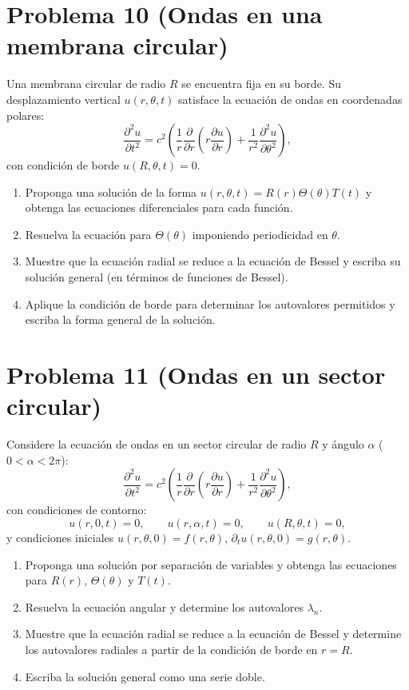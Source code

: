 \documentclass[12pt]{article}
\begin{document}
\section*{Problema 10 (Ondas en una membrana circular)}
Una membrana circular de radio \(R\) se encuentra fija en su borde. Su desplazamiento vertical \(u(r, \theta, t)\) satisface la ecuación de ondas en coordenadas polares:
\[
\frac{\partial^2 u}{\partial t^2} = c^2 \left( \frac{1}{r} \frac{\partial}{\partial r} \left( r \frac{\partial u}{\partial r} \right) + \frac{1}{r^2} \frac{\partial^2 u}{\partial \theta^2} \right),
\]
con condición de borde \(u(R, \theta, t) = 0\).
\begin{enumerate}
    \item[(a)] Proponga una solución de la forma \(u(r,\theta,t) = R(r)\Theta(\theta)T(t)\) y obtenga las ecuaciones diferenciales para cada función.
    \item[(b)] Resuelva la ecuación para \(\Theta(\theta)\) imponiendo periodicidad en \(\theta\).
    \item[(c)] Muestre que la ecuación radial se reduce a la ecuación de Bessel y escriba su solución general (en términos de funciones de Bessel).
    \item[(d)] Aplique la condición de borde para determinar los autovalores permitidos y escriba la forma general de la solución.
\end{enumerate}

\section*{Problema 11 (Ondas en un sector circular)}
Considere la ecuación de ondas en un sector circular de radio \(R\) y ángulo \(\alpha\) (\(0 < \alpha < 2\pi\)):
\[
\frac{\partial^2 u}{\partial t^2} = c^2 \left( \frac{1}{r} \frac{\partial}{\partial r} \left( r \frac{\partial u}{\partial r} \right) + \frac{1}{r^2} \frac{\partial^2 u}{\partial \theta^2} \right),
\]
con condiciones de contorno:
\[
u(r, 0, t) = 0, \qquad u(r, \alpha, t) = 0, \qquad u(R, \theta, t) = 0,
\]
y condiciones iniciales \(u(r, \theta, 0) = f(r, \theta)\), \(\partial_t u(r, \theta, 0) = g(r, \theta)\).
\begin{enumerate}
    \item[(a)] Proponga una solución por separación de variables y obtenga las ecuaciones para \(R(r)\), \(\Theta(\theta)\) y \(T(t)\).
    \item[(b)] Resuelva la ecuación angular y determine los autovalores \(\lambda_n\).
    \item[(c)] Muestre que la ecuación radial se reduce a la ecuación de Bessel y determine los autovalores radiales a partir de la condición de borde en \(r = R\).
    \item[(d)] Escriba la solución general como una serie doble.
\end{enumerate}
\end{document}
